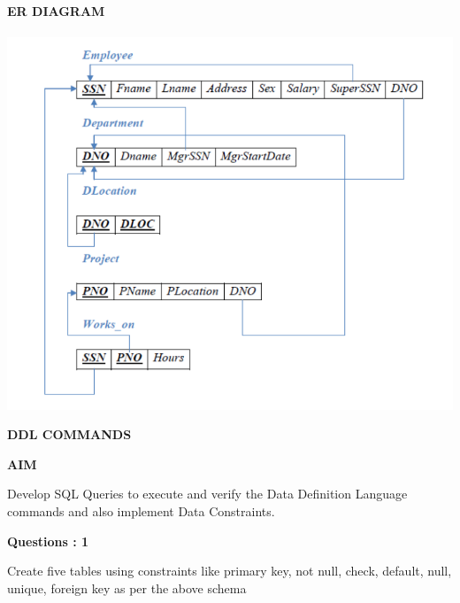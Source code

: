 \documentclass[a4paper,12pt]{report}
\begin{document}
\begin{center}
		\large\textbf{ER DIAGRAM}
	\end{center}
\paragraph{}
\includegraphics[scale=0.5]{SCHEMA.png}
 \newpage

	\begin{center}
		\large\textbf{DDL COMMANDS}
	\end{center}
	
	\begin{flushleft}
		\textbf{AIM }
	\end{flushleft} 
	    Develop SQL Queries to execute and verify the Data Definition Language commands and also implement Data Constraints.
\begin{flushleft}
    \textbf{Questions : 1}
\end{flushleft}
 Create five tables using constraints like primary key, not null, check, default, null, unique, foreign key  as per the above schema
	
\end{document}

